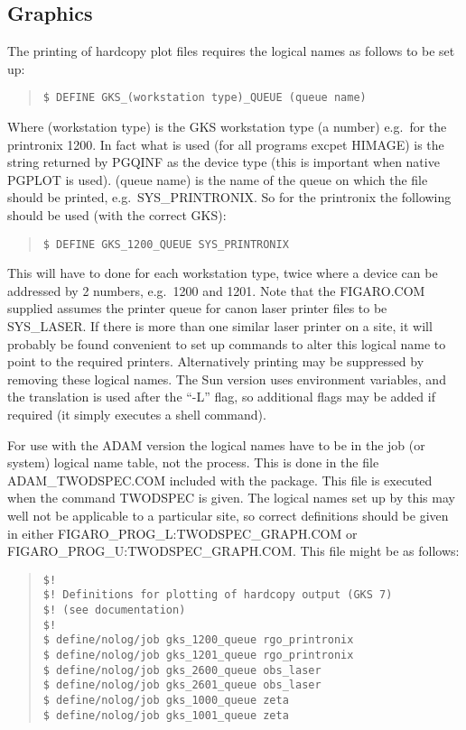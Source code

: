 \subsection{Graphics}

The printing of hardcopy plot files requires the logical names as
follows to be set up:
\begin{quote}\begin{verbatim}
$ DEFINE GKS_(workstation type)_QUEUE (queue name)
\end{verbatim}\end{quote}
 Where (workstation type) is the GKS workstation type (a number) e.g.\
for the printronix 1200.
In fact what is used (for all programs excpet HIMAGE) is the string
returned by PGQINF as the device type (this is important when native
PGPLOT is used).
(queue name) is the name of the queue on which the file should be
printed, e.g.\
SYS\_PRINTRONIX. So for the printronix the following should be used
(with the correct GKS):
\begin{quote}\begin{verbatim}
$ DEFINE GKS_1200_QUEUE SYS_PRINTRONIX
\end{verbatim}\end{quote}
 This will have to done for each workstation type, twice where a device
can be addressed by 2 numbers, e.g.\ 1200 and 1201.
Note that the FIGARO.COM supplied assumes the printer queue for canon
laser printer files to be SYS\_LASER.
If there is more than one similar laser printer on a site, it will
probably be found convenient to set up commands to alter this logical
name to point to the required printers.
Alternatively printing may be suppressed by removing these logical
names.
The Sun version uses environment variables, and the translation is used
after the ``-L'' flag, so additional flags may be added if required (it
simply executes a shell command).

For use with the ADAM version the logical names have to be in the job
(or system) logical name table, not the process.
This is done in the file ADAM\_TWODSPEC.COM included with the package.
This file is executed when the command TWODSPEC is given.
The logical names set up by this may well not be applicable to a
particular site, so correct definitions should be given in either
FIGARO\_PROG\_L:TWODSPEC\_GRAPH.COM or
FIGARO\_PROG\_U:TWODSPEC\_GRAPH.COM.
This file might be as follows:
\begin{quote}\begin{verbatim}
$!
$! Definitions for plotting of hardcopy output (GKS 7)
$! (see documentation)
$!
$ define/nolog/job gks_1200_queue rgo_printronix
$ define/nolog/job gks_1201_queue rgo_printronix
$ define/nolog/job gks_2600_queue obs_laser
$ define/nolog/job gks_2601_queue obs_laser
$ define/nolog/job gks_1000_queue zeta
$ define/nolog/job gks_1001_queue zeta
\end{verbatim}\end{quote}

